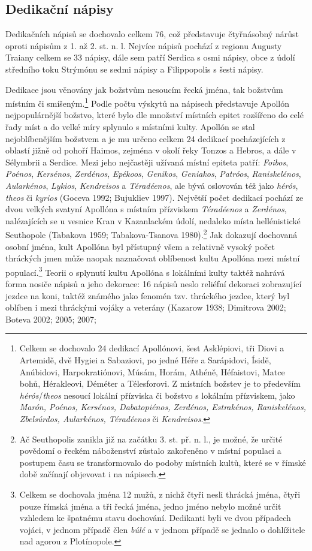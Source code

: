 \subsection[dedikační-nápisy-14]{Dedikační nápisy}

Dedikačních nápisů se dochovalo celkem 76, což představuje čtyřnásobný nárůst oproti nápisům z 1. až 2. st. n. l. Nejvíce nápisů pochází z regionu Augusty Traiany celkem se 33 nápisy, dále sem patří Serdica s osmi nápisy, obce z údolí středního toku Strýmónu se sedmi nápisy a Filippopolis s šesti nápisy.

Dedikace jsou věnovány jak božstvům nesoucím řecká jména, tak božstvům místním či smíšeným.\footnote{Celkem se dochovalo 24 dedikací Apollónovi, šest Asklépiovi, tři Diovi a Artemidě, dvě Hygiei a Sabaziovi, po jedné Héře a Sarápidovi, Ísidě, Anúbidovi, Harpokratiónovi, Músám, Horám, Athéně, Héfaistovi, Matce bohů, Hérakleovi, Déméter a Télesforovi. Z místních božstev je to především {\em hérós}/{\em theos} nesoucí lokální přízviska či božstvo s lokálním přízviskem, jako {\em Marón, Poénos, Kersénos, Dabatopiénos, Zerdénos, Estrakénos, Raniskelénos, Zbelsúrdos, Aularkénos, Téradéenos} či {\em Kendreisos}.} Podle počtu výskytů na nápisech představuje Apollón nejpopulárnější božstvo, které bylo dle množství místních epitet rozšířeno do celé řady míst a do velké míry splynulo s místními kulty. Apollón se stal nejoblíbenějším božstvem a je mu určeno celkem 24 dedikací pocházejících z oblastí jižně od pohoří Haimos, zejména v okolí řeky Tonzos a Hebros, a dále v Sélymbrii a Serdice. Mezi jeho nejčastěji užívaná místní epiteta patří: {\em Foibos}, {\em Poénos}, {\em Kersénos}, {\em Zerdénos}, {\em Epékoos}, {\em Genikos}, {\em Geniakos}, {\em Patróos}, {\em Raniskelénos}, {\em Aularkénos}, {\em Lykios}, {\em Kendreisos} a {\em Téradéenos}, ale bývá oslovován též jako {\em hérós}, {\em theos} či {\em kyrios} (Goceva 1992; Bujukliev 1997). Největší počet dedikací pochází ze dvou velkých svatyní Apollóna s místním přízviskem {\em Téradéenos} a {\em Zerdénos}, nalézajících se u vesnice Kran v Kazanlackém údolí, nedaleko místa hellénistické Seuthopole (Tabakova 1959; Tabakova-Tsanova 1980).\footnote{Ač Seuthopolis zanikla již na začátku 3. st. př. n. l., je možné, že určité povědomí o řeckém náboženství zůstalo zakořeněno v místní populaci a postupem času se transformovalo do podoby místních kultů, které se v římské době začínají objevovat i na nápisech.} Jak dokazují dochovaná osobní jména, kult Apollóna byl přístupný všem a relativně vysoký počet thráckých jmen může naopak naznačovat oblíbenost kultu Apollóna mezi místní populací.\footnote{Celkem se dochovala jména 12 mužů, z nichž čtyři nesli thrácká jména, čtyři pouze římská jména a tři řecká jména, jedno jméno nebylo možné určit vzhledem ke špatnému stavu dochování. Dedikanti byli ve dvou případech vojáci, v jednom případě člen {\em búlé} a v jednom případě se jednalo o dohlížitele nad agorou z Plotínopole.} Teorii o splynutí kultu Apollóna s lokálními kulty taktéž nahrává forma nosiče nápisů a jeho dekorace: 16 nápisů neslo reliéfní dekoraci zobrazující jezdce na koni, taktéž známého jako fenomén tzv. thráckého jezdce, který byl oblíben i mezi thráckými vojáky a veterány (Kazarow 1938; Dimitrova 2002; Boteva 2002; 2005; 2007; 